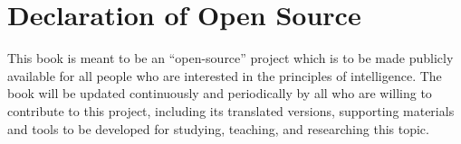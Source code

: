 \documentclass[../../book-main.tex]{subfiles}
\begin{document}
\chapter*{Declaration of Open Source}

This book is meant to be an ``open-source'' project which is to be made publicly available for all people who are interested in the principles of intelligence. The book will be updated continuously and periodically by all who are willing to contribute to this project, including its translated versions, supporting materials and tools to be developed for studying, teaching, and researching this topic.
\end{document}
